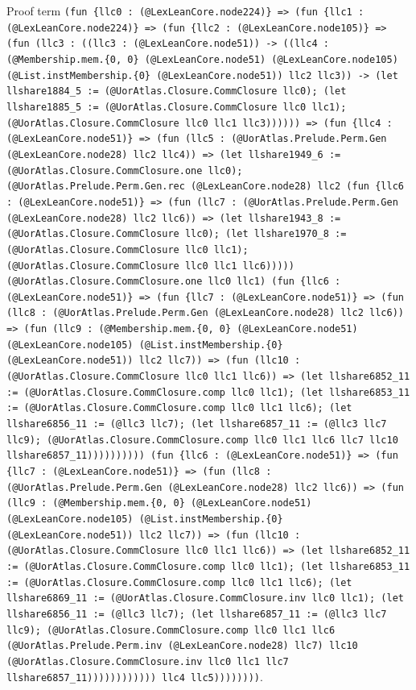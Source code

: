 \documentclass[11pt]{article}
\begin{document}
\noindent Proof term \texttt{(fun \{llc0 : (@LexLeanCore.node224)\} => (fun \{llc1 : (@LexLeanCore.node224)\} => (fun \{llc2 : (@LexLeanCore.node105)\} => (fun (llc3 : ((llc3 : (@LexLeanCore.node51)) -> ((llc4 : (@Membership.mem.\{0, 0\} (@LexLeanCore.node51) (@LexLeanCore.node105) (@List.instMembership.\{0\} (@LexLeanCore.node51)) llc2 llc3)) -> (let llshare1884\_5 := (@UorAtlas.Closure.CommClosure llc0); (let llshare1885\_5 := (@UorAtlas.Closure.CommClosure llc0 llc1); (@UorAtlas.Closure.CommClosure llc0 llc1 llc3)))))) => (fun \{llc4 : (@LexLeanCore.node51)\} => (fun (llc5 : (@UorAtlas.Prelude.Perm.Gen (@LexLeanCore.node28) llc2 llc4)) => (let llshare1949\_6 := (@UorAtlas.Closure.CommClosure.one llc0); (@UorAtlas.Prelude.Perm.Gen.rec (@LexLeanCore.node28) llc2 (fun \{llc6 : (@LexLeanCore.node51)\} => (fun (llc7 : (@UorAtlas.Prelude.Perm.Gen (@LexLeanCore.node28) llc2 llc6)) => (let llshare1943\_8 := (@UorAtlas.Closure.CommClosure llc0); (let llshare1970\_8 := (@UorAtlas.Closure.CommClosure llc0 llc1); (@UorAtlas.Closure.CommClosure llc0 llc1 llc6))))) (@UorAtlas.Closure.CommClosure.one llc0 llc1) (fun \{llc6 : (@LexLeanCore.node51)\} => (fun \{llc7 : (@LexLeanCore.node51)\} => (fun (llc8 : (@UorAtlas.Prelude.Perm.Gen (@LexLeanCore.node28) llc2 llc6)) => (fun (llc9 : (@Membership.mem.\{0, 0\} (@LexLeanCore.node51) (@LexLeanCore.node105) (@List.instMembership.\{0\} (@LexLeanCore.node51)) llc2 llc7)) => (fun (llc10 : (@UorAtlas.Closure.CommClosure llc0 llc1 llc6)) => (let llshare6852\_11 := (@UorAtlas.Closure.CommClosure.comp llc0 llc1); (let llshare6853\_11 := (@UorAtlas.Closure.CommClosure.comp llc0 llc1 llc6); (let llshare6856\_11 := (@llc3 llc7); (let llshare6857\_11 := (@llc3 llc7 llc9); (@UorAtlas.Closure.CommClosure.comp llc0 llc1 llc6 llc7 llc10 llshare6857\_11)))))))))) (fun \{llc6 : (@LexLeanCore.node51)\} => (fun \{llc7 : (@LexLeanCore.node51)\} => (fun (llc8 : (@UorAtlas.Prelude.Perm.Gen (@LexLeanCore.node28) llc2 llc6)) => (fun (llc9 : (@Membership.mem.\{0, 0\} (@LexLeanCore.node51) (@LexLeanCore.node105) (@List.instMembership.\{0\} (@LexLeanCore.node51)) llc2 llc7)) => (fun (llc10 : (@UorAtlas.Closure.CommClosure llc0 llc1 llc6)) => (let llshare6852\_11 := (@UorAtlas.Closure.CommClosure.comp llc0 llc1); (let llshare6853\_11 := (@UorAtlas.Closure.CommClosure.comp llc0 llc1 llc6); (let llshare6869\_11 := (@UorAtlas.Closure.CommClosure.inv llc0 llc1); (let llshare6856\_11 := (@llc3 llc7); (let llshare6857\_11 := (@llc3 llc7 llc9); (@UorAtlas.Closure.CommClosure.comp llc0 llc1 llc6 (@UorAtlas.Prelude.Perm.inv (@LexLeanCore.node28) llc7) llc10 (@UorAtlas.Closure.CommClosure.inv llc0 llc1 llc7 llshare6857\_11)))))))))))) llc4 llc5))))))))}.\par
\end{document}
